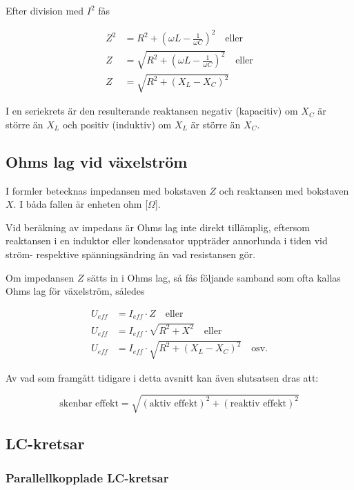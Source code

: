 Efter division med \(I^2\) fås

\begin{align*}
  Z^2 &= R^2 + ( \omega L - \frac{1}{\omega C} )^2 \quad \text{eller} \\
  Z &= \sqrt{R^2 + (\omega L - \frac{1}{\omega C})^2} \quad \text{eller} \\
  Z &= \sqrt{R^2 + (X_L - X_C)^2}
\end{align*}

I en seriekrets är den resulterande reaktansen negativ (kapacitiv) om \(X_C\) är
större än \(X_L\) och positiv (induktiv) om \(X_L\) är större än \(X_C\).

\subsection{Ohms lag vid växelström}

I formler betecknas impedansen med bokstaven \(Z\) och reaktansen med bokstaven
\(X\).
I båda fallen är enheten ohm [\(\Omega\)].

Vid beräkning av impedans är Ohms lag inte direkt tillämplig, eftersom
reaktansen i en induktor eller kondensator uppträder annorlunda i tiden vid
ström- respektive spänningsändring än vad resistansen gör.

Om impedansen \(Z\) sätts in i Ohms lag, så fås följande samband som ofta kallas
Ohms lag för växelström, således

\begin{align*}
  U_{eff} &= I_{eff} \cdot Z \quad \text{eller} \\
  U_{eff} &= I_{eff} \cdot \sqrt{R^2 + X^2} \quad \text{eller} \\
  U_{eff} &= I_{eff} \cdot \sqrt{R^2 + (X_L - X_C)^2} \quad \text{osv.}
\end{align*}

Av vad som framgått tidigare i detta avsnitt kan även slutsatsen dras att:

\[
\text{skenbar effekt} = \sqrt{(\text{aktiv effekt})^2 + (\text{reaktiv effekt})^2}
\]

\subsection{LC-kretsar}

\subsubsection{Parallellkopplade LC-kretsar}

